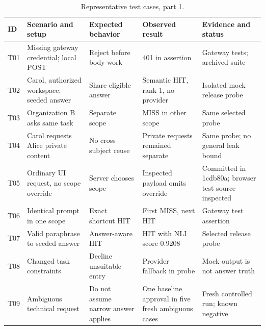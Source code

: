 \begin{table}[p]\centering\footnotesize
\caption{Representative test cases, part 1.}\label{tab:representative_cases_a}
\begin{tabular}{p{0.8cm}p{2.4cm}p{2.6cm}p{2.5cm}p{3.3cm}}
\toprule ID & Scenario and setup & Expected behavior & Observed result & Evidence and status \\\midrule
T01 & Missing gateway credential; local POST & Reject before body work & 401 in assertion & Gateway tests; archived suite \\
T02 & Carol, authorized workspace; seeded answer & Share eligible answer & Semantic HIT, rank 1, no provider & Isolated mock release probe \\
T03 & Organization B asks same task & Separate scope & MISS in other scope & Same selected probe \\
T04 & Carol requests Alice private content & No cross-subject reuse & Private requests remained separate & Same probe; no general leak bound \\
T05 & Ordinary UI request, no scope override & Server chooses scope & Inspected payload omits override & Committed in 1cdb80a; browser test source inspected \\
T06 & Identical prompt in one scope & Exact shortcut HIT & First MISS, next HIT & Gateway test assertion \\
T07 & Valid paraphrase to seeded answer & Answer-aware HIT & HIT with NLI score 0.9208 & Selected release probe \\
T08 & Changed task constraints & Decline unsuitable entry & Provider fallback in probe & Mock output is not answer truth \\
T09 & Ambiguous technical request & Do not assume narrow answer applies & One baseline approval in five fresh ambiguous cases & Fresh controlled run; known negative \\
\bottomrule
\end{tabular}
\end{table}

